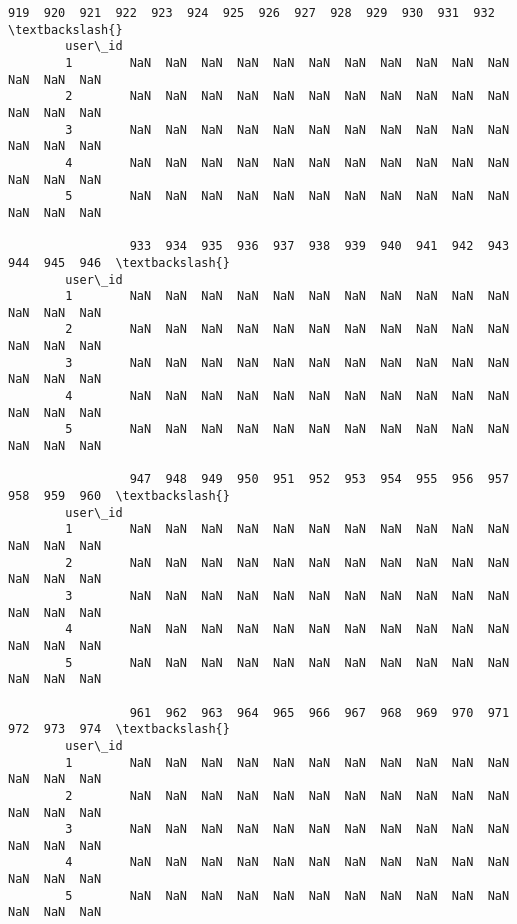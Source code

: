 \documentclass[11pt]{article}
\begin{document}
\begin{Verbatim}[commandchars=\\\{\}]
                 919  920  921  922  923  924  925  926  927  928  929  930  931  932  \textbackslash{}
        user\_id                                                                         
        1        NaN  NaN  NaN  NaN  NaN  NaN  NaN  NaN  NaN  NaN  NaN  NaN  NaN  NaN   
        2        NaN  NaN  NaN  NaN  NaN  NaN  NaN  NaN  NaN  NaN  NaN  NaN  NaN  NaN   
        3        NaN  NaN  NaN  NaN  NaN  NaN  NaN  NaN  NaN  NaN  NaN  NaN  NaN  NaN   
        4        NaN  NaN  NaN  NaN  NaN  NaN  NaN  NaN  NaN  NaN  NaN  NaN  NaN  NaN   
        5        NaN  NaN  NaN  NaN  NaN  NaN  NaN  NaN  NaN  NaN  NaN  NaN  NaN  NaN   
        
                 933  934  935  936  937  938  939  940  941  942  943  944  945  946  \textbackslash{}
        user\_id                                                                         
        1        NaN  NaN  NaN  NaN  NaN  NaN  NaN  NaN  NaN  NaN  NaN  NaN  NaN  NaN   
        2        NaN  NaN  NaN  NaN  NaN  NaN  NaN  NaN  NaN  NaN  NaN  NaN  NaN  NaN   
        3        NaN  NaN  NaN  NaN  NaN  NaN  NaN  NaN  NaN  NaN  NaN  NaN  NaN  NaN   
        4        NaN  NaN  NaN  NaN  NaN  NaN  NaN  NaN  NaN  NaN  NaN  NaN  NaN  NaN   
        5        NaN  NaN  NaN  NaN  NaN  NaN  NaN  NaN  NaN  NaN  NaN  NaN  NaN  NaN   
        
                 947  948  949  950  951  952  953  954  955  956  957  958  959  960  \textbackslash{}
        user\_id                                                                         
        1        NaN  NaN  NaN  NaN  NaN  NaN  NaN  NaN  NaN  NaN  NaN  NaN  NaN  NaN   
        2        NaN  NaN  NaN  NaN  NaN  NaN  NaN  NaN  NaN  NaN  NaN  NaN  NaN  NaN   
        3        NaN  NaN  NaN  NaN  NaN  NaN  NaN  NaN  NaN  NaN  NaN  NaN  NaN  NaN   
        4        NaN  NaN  NaN  NaN  NaN  NaN  NaN  NaN  NaN  NaN  NaN  NaN  NaN  NaN   
        5        NaN  NaN  NaN  NaN  NaN  NaN  NaN  NaN  NaN  NaN  NaN  NaN  NaN  NaN   
        
                 961  962  963  964  965  966  967  968  969  970  971  972  973  974  \textbackslash{}
        user\_id                                                                         
        1        NaN  NaN  NaN  NaN  NaN  NaN  NaN  NaN  NaN  NaN  NaN  NaN  NaN  NaN   
        2        NaN  NaN  NaN  NaN  NaN  NaN  NaN  NaN  NaN  NaN  NaN  NaN  NaN  NaN   
        3        NaN  NaN  NaN  NaN  NaN  NaN  NaN  NaN  NaN  NaN  NaN  NaN  NaN  NaN   
        4        NaN  NaN  NaN  NaN  NaN  NaN  NaN  NaN  NaN  NaN  NaN  NaN  NaN  NaN   
        5        NaN  NaN  NaN  NaN  NaN  NaN  NaN  NaN  NaN  NaN  NaN  NaN  NaN  NaN   
        

\end{Verbatim}
\end{document}
